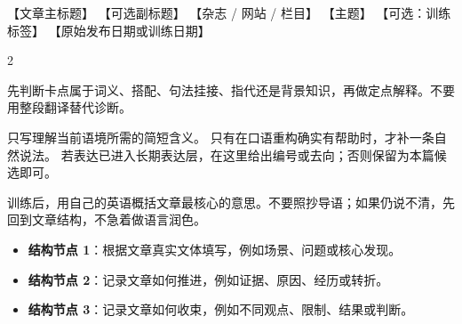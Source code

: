 \documentclass[11pt,a4paper]{ctexart}
\begin{document}
\articleheader
  {【文章主标题】}
  {【可选副标题】}
  {【杂志 / 网站 / 栏目】}
  {【主题】}
  {【可选：训练标签】}
  {【原始发布日期或训练日期】}


\begin{paracol}{2}


\switchcolumn

  {先判断卡点属于词义、搭配、句法挂接、指代还是背景知识，再做定点解释。不要用整段翻译替代诊断。}

  {只写理解当前语境所需的简短含义。}
  {只有在口语重构确实有帮助时，才补一条自然说法。}
  {若表达已进入长期表达层，在这里给出编号或去向；否则保留为本篇候选即可。}

\switchcolumn*


\switchcolumn


\end{paracol}


\begin{coretakeaway}[训练后主旨]
  训练后，用自己的英语概括文章最核心的意思。不要照抄导语；如果仍说不清，先回到文章结构，不急着做语言润色。
\end{coretakeaway}

\begin{itemize}
  \item \textbf{结构节点 1}：根据文章真实文体填写，例如场景、问题或核心发现。
  \item \textbf{结构节点 2}：记录文章如何推进，例如证据、原因、经历或转折。
  \item \textbf{结构节点 3}：记录文章如何收束，例如不同观点、限制、结果或判断。
\end{itemize}
\end{document}
